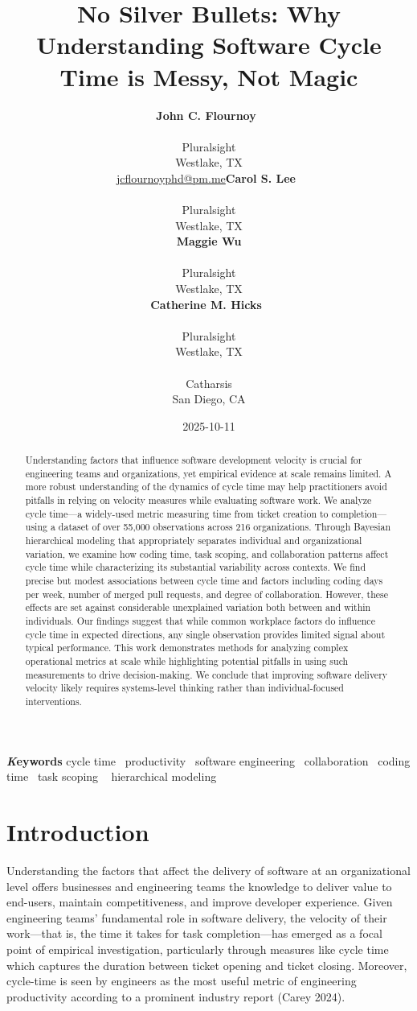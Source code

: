 \documentclass[
]{article}
\title{No Silver Bullets: Why Understanding Software Cycle Time is
Messy, Not Magic}
\author{\textbf{John C.
Flournoy}~\orcidlink{0000-0003-1735-1221}\\\\Pluralsight\\Westlake,
TX\\\href{mailto:jcflournoyphd@pm.me}{jcflournoyphd@pm.me}\asep\textbf{Carol
S. Lee}~\orcidlink{0000-0002-6909-6157}\\\\Pluralsight\\Westlake,
TX\\\asep\textbf{Maggie Wu}\\\\Pluralsight\\Westlake,
TX\\\asep\textbf{Catherine M.
Hicks}~\orcidlink{0009-0007-5657-1661}\\\\Pluralsight\\Westlake,
TX\\\\Catharsis\\San Diego, CA\\}
\date{2025-10-11}
\begin{document}
\maketitle
\begin{abstract}
Understanding factors that influence software development velocity is
crucial for engineering teams and organizations, yet empirical evidence
at scale remains limited. A more robust understanding of the dynamics of
cycle time may help practitioners avoid pitfalls in relying on velocity
measures while evaluating software work. We analyze cycle time---a
widely-used metric measuring time from ticket creation to
completion---using a dataset of over 55,000 observations across 216
organizations. Through Bayesian hierarchical modeling that appropriately
separates individual and organizational variation, we examine how coding
time, task scoping, and collaboration patterns affect cycle time while
characterizing its substantial variability across contexts. We find
precise but modest associations between cycle time and factors including
coding days per week, number of merged pull requests, and degree of
collaboration. However, these effects are set against considerable
unexplained variation both between and within individuals. Our findings
suggest that while common workplace factors do influence cycle time in
expected directions, any single observation provides limited signal
about typical performance. This work demonstrates methods for analyzing
complex operational metrics at scale while highlighting potential
pitfalls in using such measurements to drive decision-making. We
conclude that improving software delivery velocity likely requires
systems-level thinking rather than individual-focused interventions.
\end{abstract}
{\bfseries \emph Keywords}
\def\sep{\textbullet\ }
cycle time \sep productivity \sep software
engineering \sep collaboration \sep coding time \sep task scoping \sep 
hierarchical modeling



\section{Introduction}\label{introduction}

Understanding the factors that affect the delivery of software at an
organizational level offers businesses and engineering teams the
knowledge to deliver value to end-users, maintain competitiveness, and
improve developer experience. Given engineering teams' fundamental role
in software delivery, the velocity of their work---that is, the time it
takes for task completion---has emerged as a focal point of empirical
investigation, particularly through measures like cycle time which
captures the duration between ticket opening and ticket closing.
Moreover, cycle-time is seen by engineers as the most useful metric of
engineering productivity according to a prominent industry report (Carey
2024).
\end{document}
